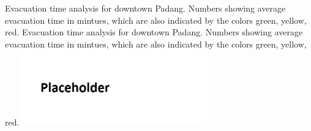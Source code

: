 \createfigure%
{Evacuation time analysis for downtown Padang. Numbers showing average evacuation time in mintues, which are also indicated by the colors green, yellow, red.}%
{Evacuation time analysis for downtown Padang. Numbers showing average evacuation time in mintues, which are also indicated by the colors green, yellow, red.}%
{\label{chap:using:padang}}%
{\includegraphics[width=0.6\textwidth, angle=0]{using/figures/dwntwnpdg}}%
{}

